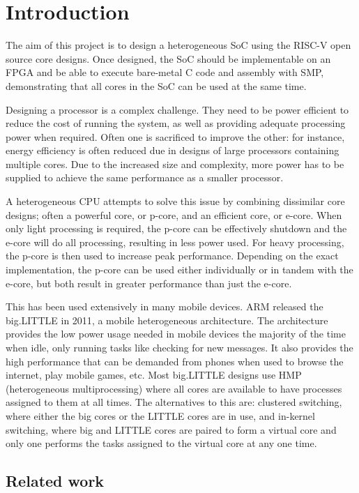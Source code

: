 \section{Introduction}
The aim of this project is to design a heterogeneous SoC using the RISC-V open source core designs. Once designed, the SoC should be implementable on an FPGA and be able to execute bare-metal C code and assembly with SMP, demonstrating that all cores in the SoC can be used at the same time.

Designing a processor is a complex challenge. They need to be power efficient to reduce the cost of running the system, as well as providing adequate processing power when required. Often one is sacrificed to improve the other: for instance, energy efficiency is often reduced due in designs of large processors containing multiple cores. Due to the increased size and complexity, more power has to be supplied to achieve the same performance as a smaller processor.

A heterogeneous CPU attempts to solve this issue by combining dissimilar core designs; often a powerful core, or p-core, and an efficient core, or e-core. When only light processing is required, the p-core can be effectively shutdown and the e-core will do all processing, resulting in less power used. For heavy processing, the p-core is then used to increase peak performance. Depending on the exact implementation, the p-core can be used either individually or in tandem with the e-core, but both result in greater performance than just the e-core.

This has been used extensively in many mobile devices. ARM released the big.LITTLE in 2011\cite{biglittle}, a mobile heterogeneous architecture. The architecture provides the low power usage needed in mobile devices the majority of the time when idle, only running tasks like checking for new messages. It also provides the high performance that can be demanded from phones when used to browse the internet, play mobile games, etc. Most big.LITTLE designs use HMP (heterogeneous multiprocessing) where all cores are available to have processes assigned to them at all times. The alternatives to this are: clustered switching, where either the big cores or the LITTLE cores are in use, and in-kernel switching, where big and LITTLE cores are paired to form a virtual core and only one performs the tasks assigned to the virtual core at any one time.

\subsection{Related work}
